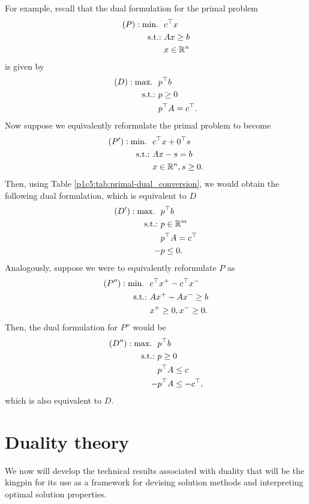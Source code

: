For example, recall that the dual formulation for the primal problem 
%
\begin{align*}
	(P) : \mathop{\text{min.~}} \ & c^\top x \\
	\mathop{\text{s.t.:~}} &Ax \geq b \\
	&x \in \mathbb{R}^n
\end{align*}
%
is given by
%
\begin{align*}
	(D) : \mathop{\text{max.~}} \ & p^\top b \\
	\mathop{\text{s.t.:~}} &p \geq 0 \\
	&p^\top A = c^\top. 
\end{align*}
%
Now suppose we equivalently reformulate the primal problem to become
\begin{align*}
	(P') : \mathop{\text{min.~}} \ & c^\top x + 0^\top s \\
	\mathop{\text{s.t.:~}} &A x - s = b \\
	&x \in \mathbb{R}^n, s \geq 0.
\end{align*}
%
Then, using Table \ref{p1c5:tab:primal-dual_conversion}, we would obtain the following dual formulation, which is equivalent to $D$
\begin{align*}
	(D') : \mathop{\text{max.~}} \ & p^\top b \\
	\mathop{\text{s.t.:~}} &p \in \mathbb{R}^m \\
	&p^\top A = c^\top \\
	-&p \leq 0.
\end{align*}
%
Analogously, suppose we were to equivalently reformulate $P$ as 
%
\begin{align*}
	(P'') : \mathop{\text{min.~}} \ & c^\top x^+ - c^\top x^- \\
	\mathop{\text{s.t.:~}} &Ax^+ - Ax^- \geq b \\
	&x^+ \geq 0, x^- \geq 0.
\end{align*}
%
Then, the dual formulation for $P''$ would be 
%
\begin{align*}
	(D'') : \mathop{\text{max.~}} \ & p^\top b \\
	\mathop{\text{s.t.:~}} &p \geq 0 \\
	&p^\top A \leq c \\
	-&p^\top A \leq -c^\top,
\end{align*}
%
which is also equivalent to $D$.


\section{Duality theory}

We now will develop the technical results associated with duality that will be the kingpin for its use as a framework for devising solution methods and interpreting optimal solution properties. 


